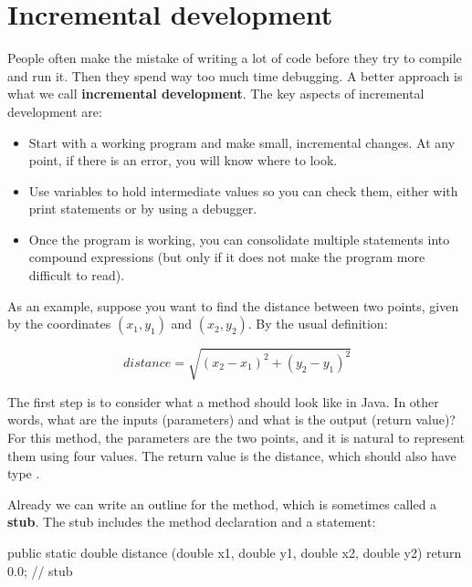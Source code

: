 \section{Incremental development}
\label{distance}


People often make the mistake of writing a lot of code before they try to compile and run it.
Then they spend way too much time debugging.
A better approach is what we call {\bf incremental development}.
The key aspects of incremental development are:

\begin{itemize}

\item Start with a working program and make small, incremental changes.
At any point, if there is an error, you will know where to look.

\item Use variables to hold intermediate values so you can check them, either with print statements or by using a debugger.

\item Once the program is working, you can consolidate multiple statements into compound expressions (but only if it does not make the program more difficult to read).

\end{itemize}

As an example, suppose you want to find the distance between two points, given by the coordinates $(x_1, y_1)$ and $(x_2, y_2)$.
By the usual definition:

\[ distance = \sqrt{(x_2 - x_1)^2 +(y_2 - y_1)^2} \]

The first step is to consider what a  method should look like in Java.
In other words, what are the inputs (parameters) and what is the output (return value)?
For this method, the parameters are the two points, and it is natural to represent them using four  values.
The return value is the distance, which should also have type .


Already we can write an outline for the method, which is sometimes called a {\bf stub}.
The stub includes the method declaration and a  statement:

\begin{code}
public static double distance
        (double x1, double y1, double x2, double y2) {
    return 0.0;  // stub
}
\end{code}

